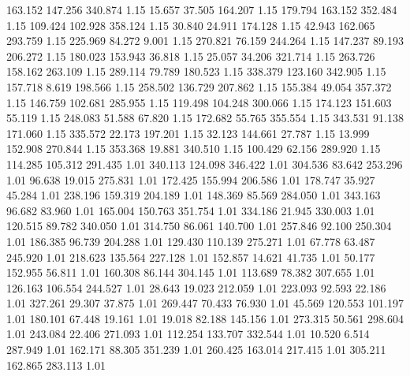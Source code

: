  163.152  147.256  340.874         1.15
  15.657   37.505  164.207         1.15
 179.794  163.152  352.484         1.15
 109.424  102.928  358.124         1.15
  30.840   24.911  174.128         1.15
  42.943  162.065  293.759         1.15
 225.969   84.272    9.001         1.15
 270.821   76.159  244.264         1.15
 147.237   89.193  206.272         1.15
 180.023  153.943   36.818         1.15
  25.057   34.206  321.714         1.15
 263.726  158.162  263.109         1.15
 289.114   79.789  180.523         1.15
 338.379  123.160  342.905         1.15
 157.718    8.619  198.566         1.15
 258.502  136.729  207.862         1.15
 155.384   49.054  357.372         1.15
 146.759  102.681  285.955         1.15
 119.498  104.248  300.066         1.15
 174.123  151.603   55.119         1.15
 248.083   51.588   67.820         1.15
 172.682   55.765  355.554         1.15
 343.531   91.138  171.060         1.15
 335.572   22.173  197.201         1.15
  32.123  144.661   27.787         1.15
  13.999  152.908  270.844         1.15
 353.368   19.881  340.510         1.15
 100.429   62.156  289.920         1.15
 114.285  105.312  291.435         1.01
 340.113  124.098  346.422         1.01
 304.536   83.642  253.296         1.01
  96.638   19.015  275.831         1.01
 172.425  155.994  206.586         1.01
 178.747   35.927   45.284         1.01
 238.196  159.319  204.189         1.01
 148.369   85.569  284.050         1.01
 343.163   96.682   83.960         1.01
 165.004  150.763  351.754         1.01
 334.186   21.945  330.003         1.01
 120.515   89.782  340.050         1.01
 314.750   86.061  140.700         1.01
 257.846   92.100  250.304         1.01
 186.385   96.739  204.288         1.01
 129.430  110.139  275.271         1.01
  67.778   63.487  245.920         1.01
 218.623  135.564  227.128         1.01
 152.857   14.621   41.735         1.01
  50.177  152.955   56.811         1.01
 160.308   86.144  304.145         1.01
 113.689   78.382  307.655         1.01
 126.163  106.554  244.527         1.01
  28.643   19.023  212.059         1.01
 223.093   92.593   22.186         1.01
 327.261   29.307   37.875         1.01
 269.447   70.433   76.930         1.01
  45.569  120.553  101.197         1.01
 180.101   67.448   19.161         1.01
  19.018   82.188  145.156         1.01
 273.315   50.561  298.604         1.01
 243.084   22.406  271.093         1.01
 112.254  133.707  332.544         1.01
  10.520    6.514  287.949         1.01
 162.171   88.305  351.239         1.01
 260.425  163.014  217.415         1.01
 305.211  162.865  283.113         1.01
